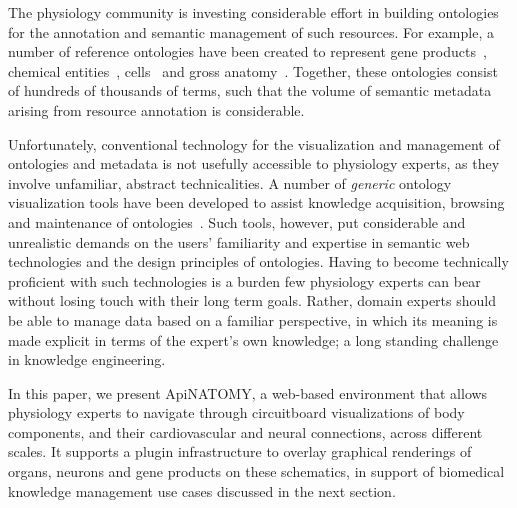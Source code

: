 The physiology community is investing
considerable effort in building ontologies for the annotation and semantic management of such
resources. For example, a number of reference ontologies have been created to represent gene
products~\cite{Bla+13}, chemical entities~\cite{HMD+13}, cells~\cite{BRA05} and gross
anatomy~\cite{RM03}. Together, these ontologies consist of hundreds of thousands of terms, such that
the volume of semantic metadata arising from resource annotation is considerable.

Unfortunately,
conventional technology for the visualization and management of ontologies and metadata is not
usefully accessible to
physiology experts, as they involve unfamiliar, abstract technicalities.
A number of \emph{generic} ontology visualization tools have been
developed to assist knowledge acquisition, browsing and maintenance of ontologies~\cite{KHL+07}.
Such tools, however, put considerable and unrealistic demands on the users' familiarity and
expertise in semantic web technologies and the design principles of ontologies.
Having to become technically proficient with such technologies is a burden few physiology experts
can bear without losing touch with their long term goals.
Rather, domain experts should be able to manage data based on a familiar perspective, in which its
meaning is made explicit in terms of the expert's own knowledge; a long standing challenge in
knowledge engineering.

%

In this paper, we present ApiNATOMY, a web-based environment that allows physiology experts to
navigate through circuitboard visualizations of body components, and their cardiovascular and neural
connections, across different scales. It supports a plugin infrastructure to overlay
graphical renderings of organs, neurons and gene products on these schematics, in support of
biomedical knowledge management use cases discussed in the next section.


